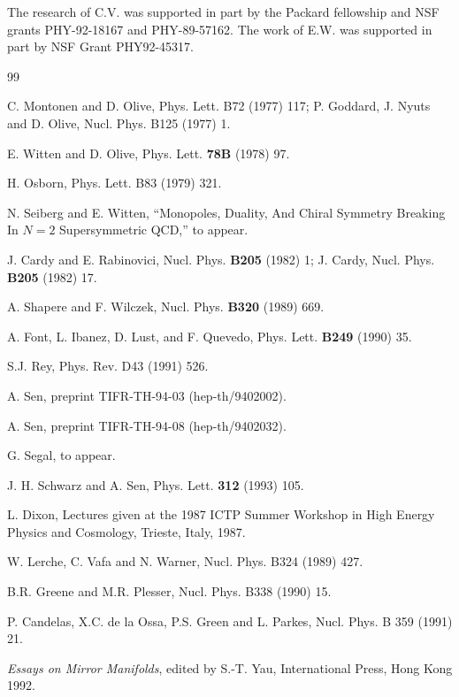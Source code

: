 \documentclass[12pt]{article}
\numberwithin{equation}{section}
\begin{document}
The research of C.V. was supported in part by the Packard fellowship and NSF
grants PHY-92-18167 and PHY-89-57162.  The work of E.W. was supported
in part by NSF Grant PHY92-45317.

\singlespacing

\begin{thebibliography}{99}

    C. Montonen and D. Olive, Phys. Lett. B72 (1977) 117;
    P. Goddard, J. Nyuts and D. Olive, Nucl. Phys. B125 (1977) 1.

  E. Witten and D. Olive, Phys. Lett. {\bf 78B} (1978) 97.

  H. Osborn, Phys. Lett. B83 (1979) 321.

  N. Seiberg and E. Witten,
  ``Monopoles, Duality, And Chiral Symmetry Breaking In $N=2$
  Supersymmetric QCD,'' to appear.

  J. Cardy and E. Rabinovici, Nucl. Phys. {\bf B205} (1982) 1; J.
  Cardy, Nucl. Phys. {\bf B205} (1982) 17.

  A. Shapere and F. Wilczek, Nucl. Phys.  {\bf B320} (1989) 669.

  A. Font, L. Ibanez, D. Lust, and F. Quevedo, Phys. Lett. {\bf B249} (1990) 35.

  S.J. Rey, Phys. Rev. D43 (1991) 526.

  A. Sen, preprint TIFR-TH-94-03 (hep-th/9402002).

  A. Sen, preprint TIFR-TH-94-08 (hep-th/9402032).

  G. Segal, to appear.

  J. H. Schwarz and A. Sen, Phys. Lett. {\bf 312} (1993) 105.

  L. Dixon, Lectures given at the 1987 ICTP Summer Workshop in High
  Energy Physics and Cosmology, Trieste, Italy,  1987.

  W. Lerche, C. Vafa and N. Warner, Nucl. Phys. B324 (1989) 427.

  B.R. Greene and M.R. Plesser, Nucl. Phys. B338 (1990) 15.

  P. Candelas, X.C. de la Ossa, P.S. Green and L. Parkes, Nucl. Phys.
  B 359 (1991) 21.

  {\it Essays on Mirror Manifolds}, edited by S.-T. Yau,
  International Press, Hong Kong 1992.


\end{thebibliography}
\end{document}
